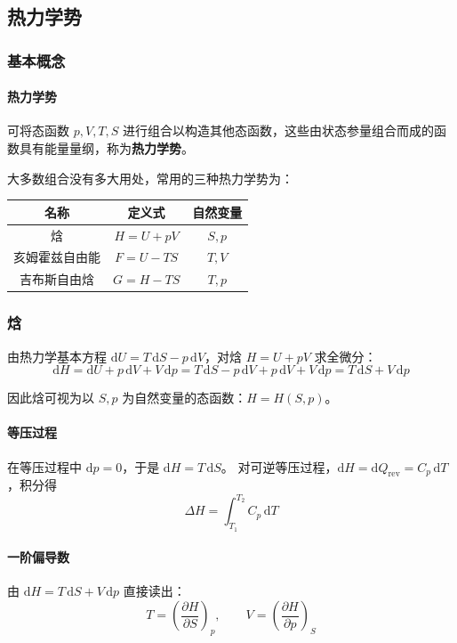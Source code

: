 \documentclass[UTF8]{ctexart}
\begin{document}
\subsection{热力学势}

\subsubsection{基本概念}

\paragraph{热力学势}
可将态函数 $p,V,T,S$ 进行组合以构造其他态函数，这些由状态参量组合而成的函数具有能量量纲，称为\textbf{热力学势}。

大多数组合没有多大用处，常用的三种热力学势为：

\begin{center}
\begin{tabular}{c|c|c}
\hline
名称 & 定义式 & 自然变量 \\
\hline
焓 & $H=U+pV$ & $S,p$ \\
亥姆霍兹自由能 & $F=U-TS$ & $T,V$ \\
吉布斯自由焓 & $G=H-TS$ & $T,p$ \\
\hline
\end{tabular}
\end{center}

\subsubsection{焓}

由热力学基本方程 $\mathrm{d}U=T\,\mathrm{d}S-p\,\mathrm{d}V$，对焓 $H=U+pV$ 求全微分：
\[
\mathrm{d}H=\mathrm{d}U+p\,\mathrm{d}V+V\,\mathrm{d}p
=T\,\mathrm{d}S-p\,\mathrm{d}V+p\,\mathrm{d}V+V\,\mathrm{d}p
=T\,\mathrm{d}S+V\,\mathrm{d}p
\]

因此焓可视为以 $S,p$ 为自然变量的态函数：$H=H(S,p)$。

\paragraph{等压过程}
在等压过程中 $\mathrm{d}p=0$，于是 $\mathrm{d}H=T\,\mathrm{d}S$。
对可逆等压过程，$\mathrm{d}H=\mathrm{d}Q_{\mathrm{rev}}=C_p\,\mathrm{d}T$，积分得
\[
\Delta H=\int_{T_1}^{T_2}C_p\,\mathrm{d}T
\]

\paragraph{一阶偏导数}
由 $\mathrm{d}H=T\,\mathrm{d}S+V\,\mathrm{d}p$ 直接读出：
\[
T=\left(\frac{\partial H}{\partial S}\right)_p,\qquad
V=\left(\frac{\partial H}{\partial p}\right)_S
\]
\end{document}
